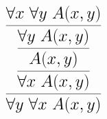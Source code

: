 \documentclass[14pt,border=2pt]{standalone}
\begin{document}
        $$
        \LARGE 

\begin{prooftree}
\hypo{\forall x~ \forall y~ A(x,y)}
\infer1{\forall y~ A(x,y)}
\infer1{A(x,y)}
\infer1{\forall x~ A(x,y)}
\infer1{\forall y~ \forall x~ A(x,y)}
\end{prooftree}
        $$
        
\end{document}
